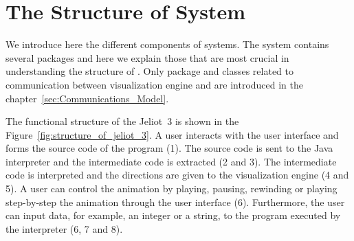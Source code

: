\section{The Structure of \jel{} System}
\label{sec:The_Components_of_the_Jeliot_3_System}

We introduce here the different components of \jel{} systems. The system
contains several packages and here we explain those that are most crucial
in understanding the structure of \jel{}. Only package and classes related
to communication between visualization engine and \djava{} are introduced
in the chapter~\ref{sec:Communications_Model}.

The functional structure of the Jeliot~3 is shown in the
Figure~\ref{fig:structure_of_jeliot_3}. A user interacts with the user
interface and forms the source code of the program (1). The source code
is sent to the Java interpreter and the intermediate code is extracted
(2 and 3). The intermediate code is interpreted and the directions are
given to the visualization engine (4 and 5). A user can control the
animation by playing, pausing, rewinding or playing step-by-step the
animation through the user interface (6). Furthermore, the user can
input data, for example, an integer or a string, to the program
executed by the interpreter (6, 7 and 8).

